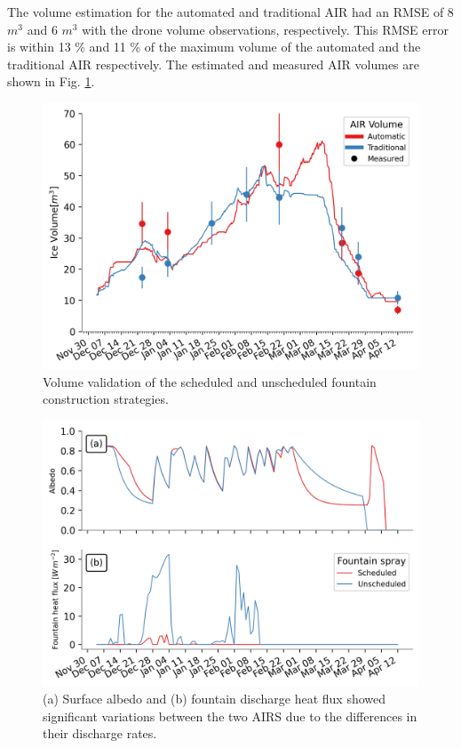 \documentclass[tc, manuscript]{copernicus}
\begin{document}
The volume estimation for the automated and traditional AIR had an RMSE of 8 $m^3$ and 6 $m^3$ with the drone
volume observations, respectively. This RMSE error is within 13 \% and 11 \% of the maximum volume of the
automated and the traditional AIR respectively. The estimated and measured AIR volumes are shown in Fig.
\ref{fig:validation}.  

\begin{figure}[t] \includegraphics[width=12cm] {Figures/validation.png} \caption{Volume validation of the
scheduled and unscheduled fountain construction strategies.} \label{fig:validation} \end{figure}

\begin{figure}[t]
\includegraphics[width=12cm]{Figures/dis_processes.png}
\caption{(a) Surface albedo  and (b) fountain discharge heat flux showed significant variations between the two
  AIRS due to the differences in their discharge rates.}
\label{fig:dis_processes}
\end{figure}
\end{document}
